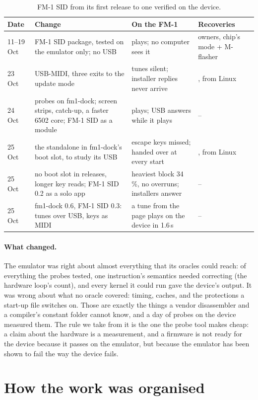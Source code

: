 \documentclass[10pt,a4paper]{article}
\begin{document}
\begin{table}[t]
\centering\footnotesize
\begin{tabularx}{\textwidth}{@{}l>{\raggedright}p{52mm}X>{\raggedright\arraybackslash}p{24mm}@{}}
\toprule
Date & Change & On the FM-1 & Recoveries\\
\midrule
11--19 Oct & FM-1 SID package, tested on the emulator only; no USB & plays; no computer sees it & owners, chip's mode + M-flasher\\
23 Oct & USB-MIDI, three exits to the update mode & tunes silent; installer replies never arrive & 3, from Linux\\
24 Oct & probes on fm1-dock; screen strips, catch-up, a faster 6502 core; FM-1 SID as a module & plays; USB answers while it plays & --\\
25 Oct & the standalone in fm1-dock's boot slot, to study its USB & escape keys missed; handed over at every start & 1, from Linux\\
25 Oct & no boot slot in releases, longer key reads; FM-1 SID 0.2 as a solo app & heaviest block 34\,\%, no overruns; installers answer & --\\
25 Oct & fm1-dock 0.6, FM-1 SID 0.3: tunes over USB, keys as MIDI & a tune from the page plays on the device in 1.6\,s & --\\
\bottomrule
\end{tabularx}
\caption{FM-1 SID from its first release to one verified on the device.}
\label{tab:rounds}
\end{table}

\paragraph{What changed.} The emulator was right about almost everything that its oracles could
reach: of everything the probes tested, one instruction's semantics needed correcting (the hardware
loop's count), and every kernel it could run gave the device's output. It was wrong about what no
oracle covered: timing, caches, and the protections a start-up file switches
on. Those are exactly the things a vendor disassembler and a compiler's constant folder cannot know,
and a day of probes on the device measured them. The rule we take from it is the one
the probe tool makes cheap: a claim about the hardware is a measurement, and a firmware is not ready
for the device because it passes on the emulator, but because the emulator has been shown to fail
the way the device fails.

\section{How the work was organised}
\end{document}
